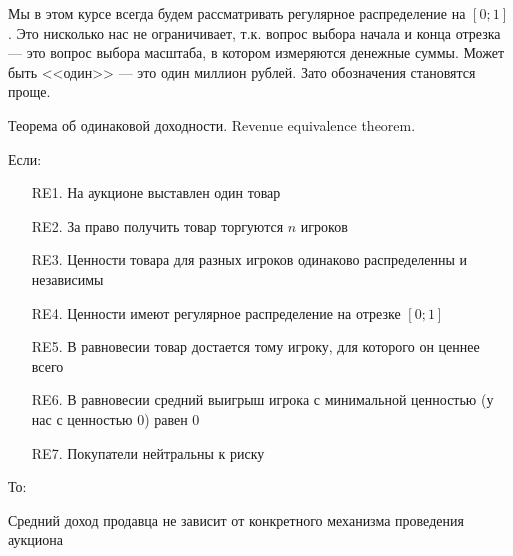 Мы в этом курсе всегда будем рассматривать регулярное распределение на $ [0;1] $. Это нисколько нас не ограничивает, т.к. вопрос выбора начала и конца отрезка --- это вопрос выбора масштаба, в котором измеряются денежные суммы. Может быть <<один>> --- это один миллион рублей. Зато обозначения становятся проще.


\begin{myth} Теорема об одинаковой доходности. Revenue equivalence theorem. 


Если:

\begin{itemize}
\item[RE1.] На аукционе выставлен один товар 
\item[RE2.] За право получить товар торгуются $ n $ игроков
\item[RE3.] Ценности товара для разных игроков одинаково распределенны и независимы
\item[RE4.] Ценности имеют регулярное распределение на отрезке $ [0;1] $
\item[RE5.] В равновесии товар достается тому игроку, для которого он ценнее всего
\item[RE6.] В равновесии средний выигрыш игрока с минимальной ценностью (у нас с ценностью 0) равен 0
\item[RE7.] Покупатели нейтральны к риску
\end{itemize}

То:

Средний доход продавца не зависит от конкретного механизма проведения аукциона

\end{myth}


